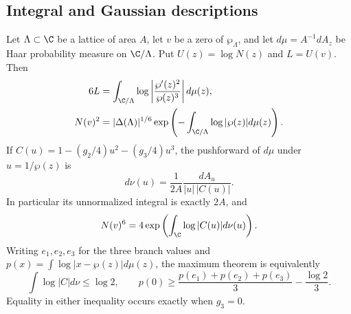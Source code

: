 
\subsection{Integral and Gaussian descriptions}

\begin{proposition}\label{ari:C.8.6}
Let $\Lambda\subset\C$ be a lattice of area $A$, let $v$ be a zero
of $\wp_\Lambda$, and let $d\mu=A^{-1}dA_z$ be Haar probability
measure on $\C/\Lambda$. Put $U(z)=\log N(z)$ and
$L=U(v)$. Then
\begin{align}
 6L&=\int_{\C/\Lambda}\log\left|\frac{\wp'(z)^2}{\wp(z)^3}\right|d\mu(z),
 \label{ari:eq:ca-mahler}\\
 N(v)^2&=|\Delta(\Lambda)|^{1/6}
      \exp\left(-\int_{\C/\Lambda}\log|\wp(z)|d\mu(z)\right).
 \label{ari:eq:ca-wpmean}
\end{align}
If $C(u)=1-(g_2/4)u^2-(g_3/4)u^3$, the pushforward of $d\mu$
under $u=1/\wp(z)$ is
\begin{equation}\label{ari:eq:ca-nu}
 d\nu(u)=\frac1{2A}\frac{dA_u}{|u|\,|C(u)|}.
\end{equation}
In particular its unnormalized integral is exactly $2A$, and
\[
 N(v)^6=4\exp\left(\int_{\C}\log|C(u)|d\nu(u)\right).
\]
Writing $e_1,e_2,e_3$ for the three branch values and
$p(x)=\int\log|x-\wp(z)|d\mu(z)$, the maximum theorem is equivalently
\[
 \int\log|C|d\nu\leq\log2,\qquad
 p(0)\geq\frac{p(e_1)+p(e_2)+p(e_3)}3-\frac{\log2}3.
\]
Equality in either inequality occurs exactly when $g_3=0$.
\end{proposition}
